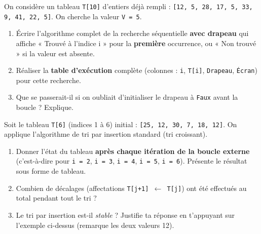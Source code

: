 \documentclass[11pt]{article}
\newcounter{popsec}
\newcounter{popsub}
\newcommand{\courssub}[1]{%
  \stepcounter{popsub}%
  \par\vspace{9pt}\noindent{\popxbold\fontsize{11.5}{13}\selectfont\color{popink}{\color{poporange}\thepopsec.\thepopsub}\hspace{6pt}#1}\par\nopagebreak\vspace{4pt}
}
\begin{document}
\begin{exercice}
On considère un tableau \texttt{T[10]} d'entiers déjà rempli : \texttt{[12, 5, 28, 17, 5, 33, 9, 41, 22, 5]}.
On cherche la valeur \texttt{V = 5}.
\begin{enumerate}
    \item Écrire l'algorithme complet de la recherche séquentielle \textbf{avec drapeau} qui affiche « Trouvé à l'indice i » pour la \textbf{première} occurrence, ou « Non trouvé » si la valeur est absente.
    \item Réaliser la \textbf{table d'exécution} complète (colonnes : \texttt{i}, \texttt{T[i]}, \texttt{Drapeau}, \texttt{Écran}) pour cette recherche.
    \item Que se passerait-il si on oubliait d'initialiser le drapeau à \texttt{Faux} avant la boucle ? Explique.
\end{enumerate}
\end{exercice}

\begin{exercice}
Soit le tableau \texttt{T[6]} (indices 1 à 6) initial : \texttt{[25, 12, 30, 7, 18, 12]}.
On applique l'algorithme de tri par insertion standard (tri croissant).
\begin{enumerate}
    \item Donner l'état du tableau \textbf{après chaque itération de la boucle externe} (c'est-à-dire pour \texttt{i = 2}, \texttt{i = 3}, \texttt{i = 4}, \texttt{i = 5}, \texttt{i = 6}). Présente le résultat sous forme de tableau.
    \item Combien de décalages (affectations \texttt{T[j+1] $\leftarrow$ T[j]}) ont été effectués au total pendant tout le tri ?
    \item Le tri par insertion est-il \emph{stable} ? Justifie ta réponse en t'appuyant sur l'exemple ci-dessus (remarque les deux valeurs 12).
\end{enumerate}
\end{exercice}

\courssub{Je me prépare au Bac}
\end{document}
